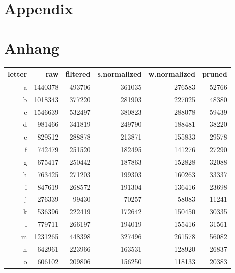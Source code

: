 {\chapter{Appendix}}    %
{\chapter{Anhang}}      %
\label{chap:appendix}

\begin{table}[ht]
    \centering
    \begin{tabularx}{\textwidth}{r R R R R R}
        \toprule
        letter & raw & filtered & s.normalized & w.normalized & pruned\\
        \midrule
        a & \num{1440378} & \num{493706} & \num{361035} & \num{276583} & \num{52766}\\
        b & \num{1018343} & \num{377220} & \num{281903} & \num{227025} & \num{48380}\\
        c & \num{1546639} & \num{532497} & \num{380823} & \num{288078} & \num{59439}\\
        d & \num{981466} & \num{341819} & \num{249790} & \num{188481} & \num{38220}\\
        e & \num{829512} & \num{288878} & \num{213871} & \num{155833} & \num{29578}\\
        f & \num{742479} & \num{251520} & \num{182495} & \num{141276} & \num{27290}\\
        g & \num{675417} & \num{250442} & \num{187863} & \num{152828} & \num{32088}\\
        h & \num{763425} & \num{271203} & \num{199303} & \num{160263} & \num{33337}\\
        i & \num{847619} & \num{268572} & \num{191304} & \num{136416} & \num{23698}\\
        j & \num{276339} & \num{99430} & \num{70257} & \num{58083} & \num{11241}\\
        k & \num{536396} & \num{222419} & \num{172642} & \num{150450} & \num{30335}\\
        l & \num{779711} & \num{266197} & \num{194019} & \num{155416} & \num{31561}\\
        m & \num{1231265} & \num{448398} & \num{327496} & \num{261578} & \num{56082}\\
        n & \num{642961} & \num{223966} & \num{163531} & \num{128920} & \num{26837}\\
        o & \num{606102} & \num{209806} & \num{156250} & \num{118133} & \num{20383}\\

\end{tabularx}
\end{table}
